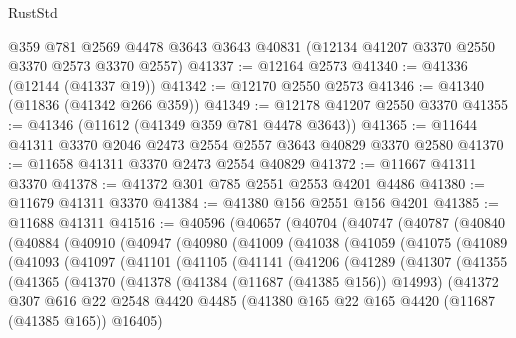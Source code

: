 \begin{lexlean}{RustStd}
\begin{coremodule}
    @359
    @781
    @2569
    @4478
    @3643
    @3643
    @40831
    (@12134 @41207 @3370 @2550 @3370 @2573 @3370 @2557)
@41337 := @12164 @2573
@41340 := @41336 (@12144 (@41337 @19))
@41342 := @12170 @2550 @2573
@41346 := @41340 (@11836 (@41342 @266 @359))
@41349 := @12178 @41207 @2550 @3370
@41355 := @41346 (@11612 (@41349 @359 @781 @4478 @3643))
@41365 := @11644 @41311 @3370 @2046 @2473 @2554 @2557 @3643 @40829 @3370 @2580
@41370 := @11658 @41311 @3370 @2473 @2554 @40829
@41372 := @11667 @41311 @3370
@41378 := @41372 @301 @785 @2551 @2553 @4201 @4486
@41380 := @11679 @41311 @3370
@41384 := @41380 @156 @2551 @156 @4201
@41385 := @11688 @41311
@41516 := @40596
    (@40657
      (@40704
        (@40747
          (@40787
            (@40840
              (@40884
                (@40910
                  (@40947
                    (@40980
                      (@41009
                        (@41038
                          (@41059
                            (@41075
                              (@41089
                                (@41093
                                  (@41097
                                    (@41101
                                      (@41105
                                        (@41141
                                          (@41206
                                            (@41289
                                              (@41307
                                                (@41355
                                                  (@41365
                                                    (@41370
                                                      (@41378
                                                        (@41384 (@11687 (@41385 @156)) @14993)
                                                        (@41372
                                                          @307
                                                          @616
                                                          @22
                                                          @2548
                                                          @4420
                                                          @4485
                                                          (@41380
                                                            @165
                                                            @22
                                                            @165
                                                            @4420
                                                            (@11687 (@41385 @165))
                                                            @16405)

\end{coremodule}
\end{lexlean}
